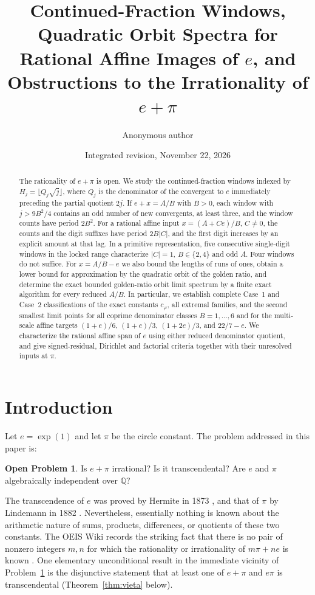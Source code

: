 \documentclass[11pt]{amsart}
\title[On the Irrationality of $e+\pi$]{Continued-Fraction Windows, Quadratic Orbit Spectra for Rational Affine Images of $e$, and Obstructions to the Irrationality of $e+\pi$}
\author{Anonymous author}
\date{Integrated revision, November 22, 2026}
\theoremstyle{definition}
\newtheorem{problem}[theorem]{Open Problem}
\theoremstyle{remark}
\numberwithin{equation}{section}
\newcommand{\Q}{\mathbb{Q}}
\newcommand{\ee}{e}
\begin{document}
\begin{abstract}
The rationality of $e+\pi$ is open. We study the continued-fraction
windows indexed by $H_j=\lfloor Q_j\sqrt j\rfloor$, where $Q_j$ is the
denominator of the convergent to $e$ immediately preceding the partial
quotient $2j$. If $e+x=A/B$ with $B>0$, each window with $j>9B^2/4$
contains an odd number of new convergents, at least three, and the
window counts have period $2B^2$. For a rational affine input
$x=(A+Ce)/B$, $C\ne0$, the counts and the digit suffixes have period
$2B|C|$, and the first digit increases by an explicit amount at that lag.
In a primitive representation, five consecutive single-digit windows
in the locked range characterize $|C|=1$, $B\in\{2,4\}$ and odd $A$.
Four windows do not suffice. For $x=A/B-e$ we also bound the lengths
of runs of ones, obtain a lower bound for approximation by the
quadratic orbit of the golden ratio, and determine the exact
bounded golden-ratio orbit limit spectrum by a finite exact algorithm for
every reduced $A/B$. In particular, we establish complete Case~1 and Case~2
classifications of the exact constants $c_\varphi$, all extremal families,
and the second smallest limit points for all coprime denominator classes
$B=1,\dots,6$ and for the multi-scale affine targets $(1+e)/6$, $(1+e)/3$,
$(1+2e)/3$, and $22/7-e$.
We characterize the rational affine span of $e$ using
either reduced denominator quotient, and give signed-residual,
Dirichlet and factorial criteria together with their unresolved inputs
at $\pi$.
\end{abstract}

\maketitle

\section{Introduction}\label{sec:intro}

Let $\ee=\exp(1)$ and let $\pi$ be the circle constant. The problem addressed in this paper is:

\begin{problem}\label{prob:main}
Is $e+\pi$ irrational? Is it transcendental? Are $e$ and $\pi$ algebraically independent over $\Q$?
\end{problem}

The transcendence of $\ee$ was proved by Hermite in 1873 \cite{Hermite1873}, and that of $\pi$ by Lindemann in 1882 \cite{Lindemann1882}. Nevertheless, essentially nothing is known about the arithmetic nature of sums, products, differences, or quotients of these two constants. The OEIS Wiki records the striking fact that there is no pair of nonzero integers $m,n$ for which the rationality or irrationality of $m\pi+n\ee$ is known \cite{OEIS}. One elementary unconditional result in the immediate vicinity of Problem~\ref{prob:main} is the disjunctive statement that at least one of $e+\pi$ and $e\pi$ is transcendental (Theorem~\ref{thm:vieta} below).
\end{document}
